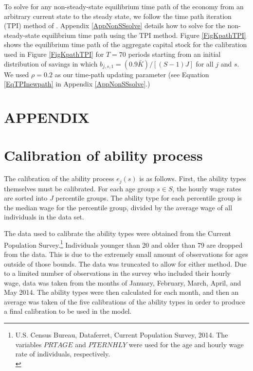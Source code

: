\documentclass[letterpaper,12pt]{article}
\theoremstyle{definition}
\begin{document}
\begin{spacing}{1.5}
    To solve for any non-steady-state equilibrium time path of the economy from an arbitrary current state to the steady state, we follow the time path iteration (TPI) method of \citet{AuerbachKotlikoff:1987}. Appendix \ref{AppNonSSsolve} details how to solve for the non-steady-state equilibrium time path using the TPI method. Figure \ref{FigKpathTPI} shows the equilibrium time path of the aggregate capital stock for the calibration used in Figure \ref{FigKpathTPI} for $T=70$ periods starting from an initial distribution of savings in which $b_{j,s,1}=(0.9\bar{K})/[(S-1)J]$ for all $j$ and $s$. We used $\rho=0.2$ as our time-path updating parameter (see Equation \eqref{EqTPInewpath} in Appendix \ref{AppNonSSsolve}.)


\clearpage

\end{spacing}

\newpage
\renewcommand{\theequation}{A.\arabic{section}.\arabic{equation}}
\renewcommand{\thesection}{A-\arabic{section}}   %
\setcounter{equation}{0}                         %
\setcounter{section}{0}                          %
\section*{APPENDIX}                              %

\section{Calibration of ability process}\label{AppAbilCalib}

  The calibration of the ability process $e_j(s)$ is as follows.  First, the ability types themselves must be calibrated. For each age group $s \in S$, the hourly wage rates are sorted into $J$ percentile groups.  The ability type for each percentile group is the median wage for the percentile group, divided by the average wage of all individuals in the data set.

  The data used to calibrate the ability types were obtained from the Current Population Survey.\footnote{U.S. Census Bureau, Dataferret, Current Population Survey, 2014. The variables $PRTAGE$ and $PTERNHLY$ were used for the age and hourly wage rate of individuals, respectively. \\ [-2pt]} Individuals younger than 20 and older than 79 are dropped from the data. This is due to the extremely small amount of observations for ages outside of those bounds. The data was truncated to allow for either method. Due to a limited number of observations in the survey who included their hourly wage, data was taken from the months of January, February, March, April, and May 2014.  The ability types were then calculated for each month, and then an average was taken of the five calibrations of the ability types in order to produce a final calibration to be used in the model.
\end{document}
